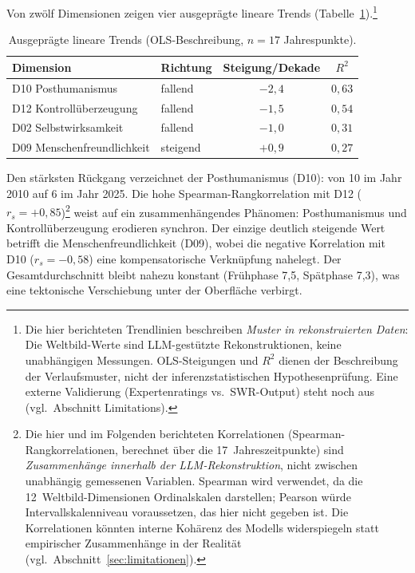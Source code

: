 \documentclass[12pt,a4paper]{article}
\begin{document}
Von zw\"olf Dimensionen zeigen vier ausgepr\"agte lineare Trends (Tabelle~\ref{tab:trends}).\footnote{Die hier berichteten Trendlinien beschreiben \textit{Muster in rekonstruierten Daten}: Die Weltbild-Werte sind LLM-gest\"utzte Rekonstruktionen, keine unabh\"angigen Messungen. OLS-Steigungen und $R^2$ dienen der Beschreibung der Verlaufsmuster, nicht der inferenzstatistischen Hypothesenpr\"ufung. Eine externe Validierung (Expertenratings vs.\ SWR-Output) steht noch aus (vgl.\ Abschnitt Limitations).}

\begin{table}[htbp]
  \centering
  \caption{Ausgepr\"agte lineare Trends (OLS-Beschreibung, $n=17$ Jahrespunkte).}
  \label{tab:trends}
  \begin{tabular}{l l c c}
    \toprule
    \textbf{Dimension} & \textbf{Richtung} & \textbf{Steigung/Dekade} & $R^2$ \\
    \midrule
    D10 Posthumanismus       & fallend  & $-2{,}4$ & $0{,}63$ \\
    D12 Kontroll\"uberzeugung & fallend  & $-1{,}5$ & $0{,}54$ \\
    D02 Selbstwirksamkeit    & fallend  & $-1{,}0$ & $0{,}31$ \\
    D09 Menschenfreundlichkeit & steigend & $+0{,}9$ & $0{,}27$ \\
    \bottomrule
  \end{tabular}
\end{table}

Den st\"arksten R\"uckgang verzeichnet der Posthumanismus (D10): von 10 im Jahr 2010 auf 6 im Jahr 2025. Die hohe Spearman-Rangkorrelation mit D12 ($r_s = +0{,}85$)\footnote{Die hier und im Folgenden berichteten Korrelationen (Spearman-Rangkorrelationen, berechnet \"uber die 17~Jahreszeitpunkte) sind \emph{Zusammenh\"ange innerhalb der LLM-Rekonstruktion}, nicht zwischen unabh\"angig gemessenen Variablen. Spearman wird verwendet, da die 12~Weltbild-Dimensionen Ordinalskalen darstellen; Pearson w\"urde Intervallskalenniveau voraussetzen, das hier nicht gegeben ist. Die Korrelationen k\"onnten interne Koh\"arenz des Modells widerspiegeln statt empirischer Zusammenh\"ange in der Realit\"at (vgl.\ Abschnitt~\ref{sec:limitationen}).} weist auf ein zusammenh\"angendes Ph\"anomen: Posthumanismus und Kontroll\"uberzeugung erodieren synchron. Der einzige deutlich steigende Wert betrifft die Menschenfreundlichkeit (D09), wobei die negative Korrelation mit D10 ($r_s = -0{,}58$) eine kompensatorische Verkn\"upfung nahelegt. Der Gesamtdurchschnitt bleibt nahezu konstant (Fr\"uhphase 7,5, Sp\"atphase 7,3), was eine tektonische Verschiebung unter der Oberfl\"ache verbirgt.
\end{document}
